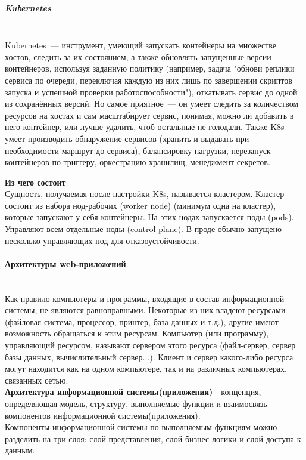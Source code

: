 \subparagraph{Kubernetes} ~\\
    Kubernetes~--- инструмент, умеющий запускать контейнеры на множестве хостов, следить за их состоянием, а также обновлять запущенные версии контейнеров, используя заданную политику (например, задача "обнови реплики сервиса по очереди, переключая каждую из них лишь по завершении скриптов запуска и успешной проверки работоспособности"), откатывать сервис до одной из сохранённых версий. Но самое приятное~--- он умеет следить за количеством ресурсов на хостах и сам масштабирует сервис, понимая, можно ли добавить в него контейнер, или лучше удалить, чтоб остальные не голодали. Также K8s умеет производить обнаружение сервисов (хранить и выдавать при необходимости маршрут до сервиса), балансировку нагрузки, перезапуск контейнеров по триггеру, оркестрацию хранилищ, менеджмент секретов.

    \textbf{Из чего состоит} ~\\
    Сущность, получаемая после настройки K8s, называется кластером. Кластер состоит из набора нод-рабочих (worker node) (минимум одна на кластер), которые запускают у себя контейнеры. На этих нодах запускается поды (pods). Управляют всем отдельные ноды (control plane). В проде обычно запущено несколько управляющих нод для отказоустойчивости.\autocite{KuberComponents}

\paragraph{Архитектуры web-приложений}~\\

Как правило компьютеры и программы, входящие в состав информационной системы, не
являются равноправными. Некоторые из них владеют ресурсами (файловая система,
процессор, принтер, база данных и т.д.), другие имеют возможность обращаться к этим
ресурсам. Компьютер (или программу), управляющий ресурсом, называют сервером этого
ресурса (файл-сервер, сервер базы данных, вычислительный сервер...). Клиент и сервер
какого-либо ресурса могут находится как на одном компьютере, так и на различных
компьютерах, связанных сетью.~\\
\textbf{Архитектура информационной системы(приложения)} - концепция, определяющая модель,
структуру, выполняемые функции и взаимосвязь компонентов информационной
системы(приложения).~\\
Компоненты информационной системы по выполняемым функциям можно разделить на
три слоя: слой представления, слой бизнес-логики и слой доступа к данным.~\\

